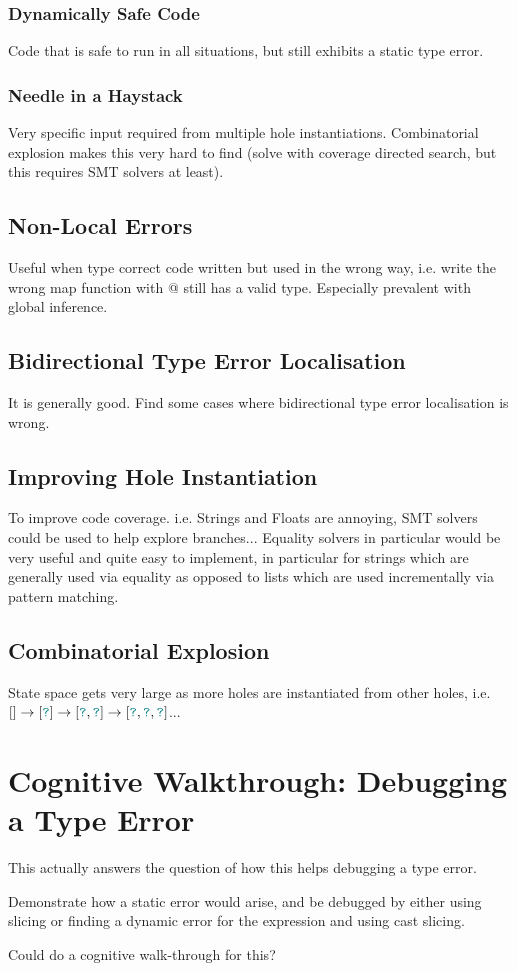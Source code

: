 \subsubsection{Dynamically Safe Code}
Code that is safe to run in all situations, but still exhibits a static type error.

\subsubsection{Needle in a Haystack}
Very specific input required from multiple hole instantiations. Combinatorial explosion makes this very hard to find (solve with coverage directed search, but this requires SMT solvers at least).

\subsection{Non-Local Errors}
Useful when type correct code written but used in the wrong way, i.e. write the wrong map function with @ still has a valid type. Especially prevalent with global inference.
\subsection{Bidirectional Type Error Localisation}
It is generally good. Find some cases where bidirectional type error localisation is wrong.
\subsection{Improving Hole Instantiation}
To improve code coverage. i.e. Strings and Floats are annoying, SMT solvers could be used to help explore branches... Equality solvers in particular would be very useful and quite easy to implement, in particular for strings which are generally used via equality as opposed to lists which are used incrementally via pattern matching.
\subsection{Combinatorial Explosion}
State space gets very large as more holes are instantiated from other holes, i.e. $[] \to [{\color{teal}\texttt{?}}] \to [{\color{teal}\texttt{?}}, {\color{teal}\texttt{?}}] \to [{\color{teal}\texttt{?}},{\color{teal}\texttt{?}},{\color{teal}\texttt{?}}]$...

\section{Cognitive Walkthrough: Debugging a Type Error}
\label{sec:CognitiveWalkthrough}
This actually answers the question of how this helps debugging a type error.

Demonstrate how a static error would arise, and be debugged by either using slicing or finding a dynamic error for the expression and using cast slicing.

Could do a cognitive walk-through for this?
